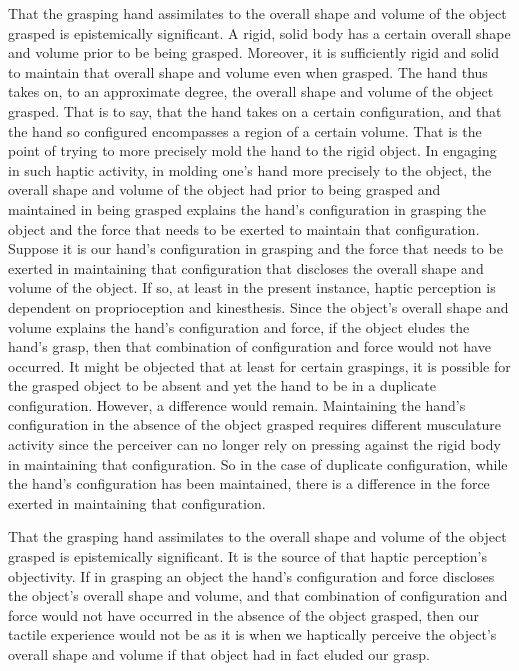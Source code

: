 \documentclass[12pt]{article}
\begin{document}
That the grasping hand assimilates to the overall shape and volume of the object grasped is epistemically significant. A rigid, solid body has a certain overall shape and volume prior to be being grasped. Moreover, it is sufficiently rigid and solid to maintain that overall shape and volume even when grasped. The hand thus takes on, to an approximate degree, the overall shape and volume of the object grasped. That is to say, that the hand takes on a certain configuration, and that the hand so configured encompasses a region of a certain volume. That is the point of trying to more precisely mold the hand to the rigid object. In engaging in such haptic activity, in molding one's hand more precisely to the object, the overall shape and volume of the object had prior to being grasped and maintained in being grasped explains the hand's configuration in grasping the object and the force that needs to be exerted to maintain that configuration. Suppose it is our hand's configuration in grasping and the force that needs to be exerted in maintaining that configuration that discloses the overall shape and volume of the object. If so, at least in the present instance, haptic perception is dependent on proprioception and kinesthesis. Since the object's overall shape and volume explains the hand's configuration and force, if the object eludes the hand's grasp, then that combination of configuration and force would not have occurred. It might be objected that at least for certain graspings, it is possible for the grasped object to be absent and yet the hand to be in a duplicate configuration. However, a difference would remain. Maintaining the hand's configuration in the absence of the object grasped requires different musculature activity since the perceiver can no longer rely on pressing against the rigid body in maintaining that configuration. So in the case of duplicate configuration, while the hand's configuration has been maintained, there is a difference in the force exerted in maintaining that configuration.

That the grasping hand assimilates to the overall shape and volume of the object grasped is epistemically significant. It is the source of that haptic perception's objectivity. If in grasping an object the hand's configuration and force discloses the object's overall shape and volume, and that combination of configuration and force would not have occurred in the absence of the object grasped, then our tactile experience would not be as it is when we haptically perceive the object's overall shape and volume if that object had in fact eluded our grasp. 
\end{document}
